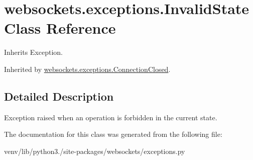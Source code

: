\hypertarget{classwebsockets_1_1exceptions_1_1_invalid_state}{}\section{websockets.\+exceptions.\+Invalid\+State Class Reference}
\label{classwebsockets_1_1exceptions_1_1_invalid_state}


Inherits Exception.



Inherited by \hyperlink{classwebsockets_1_1exceptions_1_1_connection_closed}{websockets.\+exceptions.\+Connection\+Closed}.



\subsection{Detailed Description}
\begin{DoxyVerb}Exception raised when an operation is forbidden in the current state.\end{DoxyVerb}
 

The documentation for this class was generated from the following file\+:\begin{DoxyCompactItemize}
\item 
venv/lib/python3./site-\/packages/websockets/exceptions.\+py\end{DoxyCompactItemize}
